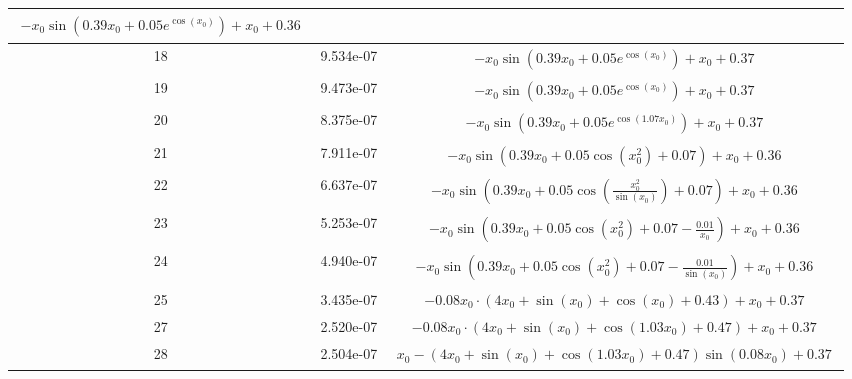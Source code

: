 \begin{center}
\begin{tabular}{|c|c|c|}
$\begin{aligned}- x_{0} \sin{\left(0.39 x_{0} + 0.05 e^{\cos{\left(x_{0} \right)}} \right)} + x_{0} + 0.36\end{aligned}$\\ \hline18 & 9.534e-07 & $\begin{aligned}- x_{0} \sin{\left(0.39 x_{0} + 0.05 e^{\cos{\left(x_{0} \right)}} \right)} + x_{0} + 0.37\end{aligned}$\\ \hline19 & 9.473e-07 & $\begin{aligned}- x_{0} \sin{\left(0.39 x_{0} + 0.05 e^{\cos{\left(x_{0} \right)}} \right)} + x_{0} + 0.37\end{aligned}$\\ \hline20 & 8.375e-07 & $\begin{aligned}- x_{0} \sin{\left(0.39 x_{0} + 0.05 e^{\cos{\left(1.07 x_{0} \right)}} \right)} + x_{0} + 0.37\end{aligned}$\\ \hline21 & 7.911e-07 & $\begin{aligned}- x_{0} \sin{\left(0.39 x_{0} + 0.05 \cos{\left(x_{0}^{2} \right)} + 0.07 \right)} + x_{0} + 0.36\end{aligned}$\\ \hline22 & 6.637e-07 & $\begin{aligned}- x_{0} \sin{\left(0.39 x_{0} + 0.05 \cos{\left(\frac{x_{0}^{2}}{\sin{\left(x_{0} \right)}} \right)} + 0.07 \right)} + x_{0} + 0.36\end{aligned}$\\ \hline23 & 5.253e-07 & $\begin{aligned}- x_{0} \sin{\left(0.39 x_{0} + 0.05 \cos{\left(x_{0}^{2} \right)} + 0.07 - \frac{0.01}{x_{0}} \right)} + x_{0} + 0.36\end{aligned}$\\ \hline24 & 4.940e-07 & $\begin{aligned}- x_{0} \sin{\left(0.39 x_{0} + 0.05 \cos{\left(x_{0}^{2} \right)} + 0.07 - \frac{0.01}{\sin{\left(x_{0} \right)}} \right)} + x_{0} + 0.36\end{aligned}$\\ \hline25 & 3.435e-07 & $\begin{aligned}- 0.08 x_{0} \cdot \left(4 x_{0} + \sin{\left(x_{0} \right)} + \cos{\left(x_{0} \right)} + 0.43\right) + x_{0} + 0.37\end{aligned}$\\ \hline27 & 2.520e-07 & $\begin{aligned}- 0.08 x_{0} \cdot \left(4 x_{0} + \sin{\left(x_{0} \right)} + \cos{\left(1.03 x_{0} \right)} + 0.47\right) + x_{0} + 0.37\end{aligned}$\\ \hline28 & 2.504e-07 & $\begin{aligned}x_{0} - \left(4 x_{0} + \sin{\left(x_{0} \right)} + \cos{\left(1.03 x_{0} \right)} + 0.47\right) \sin{\left(0.08 x_{0} \right)} + 0.37\end{aligned}$\\ \hline\end{tabular}
        \end{center}
        